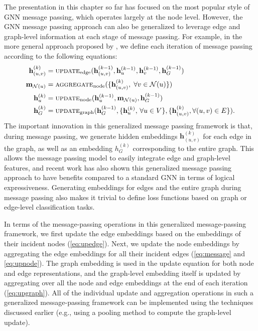 \documentclass[10pt]{book}
\begin{document}
The presentation in this chapter so far has focused on the most popular style of GNN message passing, which operates largely at the node level. However, the GNN message passing approach can also be generalized to leverage edge and graph-level information at each stage of message passing. For example, in the more general approach proposed by \cite{battaglia2018relational}, we define each iteration of message passing according to the following equations:
\begin{align}
    \mathbf h^{(k)}_{(u,v)} &= \textsc{update}_\text{edge} (\mathbf h_{(u,v)}^{(k-1)}, \mathbf h_u^{(k-1)}, \mathbf h_v^{(k-1)}, \mathbf h_G^{(k-1)})
    \label{eq:upedge} \\
    \mathbf m_{\mathcal N(u)} &= \textsc{aggregate}_\text{node}(\{ \mathbf h_{(u,v)}^{(k)}, \; \forall v \in \mathcal N(u) \})
    \label{eq:message} \\
    \mathbf h^{(k)}_u &= \textsc{update}_\text{node} ( \mathbf h_u^{(k-1)}, \mathbf m_{\mathcal N(u)}, \mathbf h_G^{(k-1)})
    \label{eq:upnode} \\
    \mathbf h^{(k)}_G &= \textsc{update}_\text{graph}(\mathbf h_G^{( k-1)}, \{ \mathbf h_u^{(k)}, \, \forall u \in V\}, \{ \mathbf h_{(u,v)}^{(k)}, \forall (u, v) \in E\}).
    \label{eq:upgraph}
\end{align}
The important innovation in this generalized message passing framework is that, during message passing, we generate hidden embeddings $\mathbf h_{(u,v)}^{(k)}$ for each edge in the graph, as well as an embedding $h_G^{(k)}$ corresponding to the entire graph. This allows the message passing model to easily integrate edge and graph-level features, and recent work has also shown this generalized message passing approach to have benefits compared to a standard GNN in terms of logical expressiveness. Generating embeddings for edges and the entire graph during message passing also makes it trivial to define loss functions based on graph or edge-level classification tasks.

In terms of the message-passing operations in this generalized message-passing framework, we first update the edge embeddings based on the embeddings of their incident nodes (\autoref{eq:upedge}). Next, we update the node embeddings by aggregating the edge embeddings for all their incident edges (\autoref{eq:message} and \ref{eq:upnode}). The graph embedding is used in the update equation for both node and edge representations, and the graph-level embedding itself is updated by aggregating over all the node and edge embeddings at the end of each iteration (\autoref{eq:upgraph}). All of the individual update and aggregation operations in such a generalized message-passing framework can be implemented using the
techniques discussed earlier (e.g., using a pooling method to compute the graph-level update).
\end{document}
